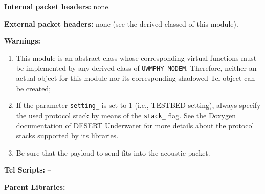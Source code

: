 \begin{description}
\begin{description}
          \end{description}
   \item {\bf Internal packet headers:} none. 
   \item {\bf External packet headers:} none (see the derived classed of this module).
   \item {\bf Warnings:} 
    \begin{enumerate}
     \item This module is an abstract class whose corresponding virtual functions must be implemented by any derived class of {\tt UWMPHY\_MODEM}. Therefore, neither an actual object for this module nor its corresponding shadowed Tcl object can be created;
     \item If the parameter {\tt setting\_} is set to 1 (i.e., TESTBED setting), always specify the used protocol stack by means of the {\tt stack\_} flag. See the Doxygen documentation of DESERT Underwater for more details about the protocol stacks supported by its libraries.   
     \item Be sure that the payload to send fits into the acoustic packet.
    \end{enumerate}
    \item {\bf Tcl Scripts:} --
    \item {\bf Parent Libraries:} --    
\end{description}

\vspace{1 cm}

